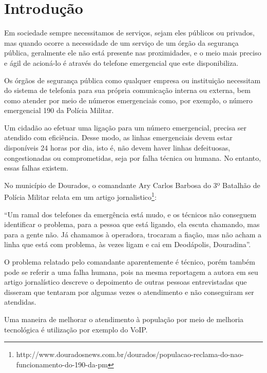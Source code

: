 
\chapter{Introdução}%
Em sociedade sempre necessitamos de serviços, sejam eles públicos ou privados, mas quando ocorre a necessidade de um serviço de um órgão da segurança pública, geralmente ele não está presente nas proximidades, e o meio mais preciso e ágil de acioná-lo é através do telefone emergencial que este disponibiliza.

Os órgãos de segurança pública como qualquer empresa ou instituição necessitam do sistema de telefonia para sua própria comunicação interna ou externa, bem como atender por meio de números emergenciais como, por exemplo, o número emergencial 190 da Polícia Militar.

Um cidadão ao efetuar uma ligação para um número emergencial, precisa ser atendido com eficiência. Desse modo, as linhas emergenciais devem estar disponíveis 24 horas por dia, isto é, não devem haver linhas defeituosas, congestionadas ou comprometidas, seja por falha técnica ou humana. No entanto, essas falhas existem.

No município de Dourados, o comandante Ary Carlos Barbosa do 3º Batalhão de Polícia Militar relata em um artigo jornalistico\footnote{http://www.douradosnews.com.br/dourados/populacao-reclama-do-nao-funcionamento-do-190-da-pm}:

\begin{citacao}
``Um ramal dos telefones da emergência está mudo, e os técnicos não conseguem identificar o problema, para a pessoa que está ligando, ela escuta chamando, mas para a gente não. Já chamamos à operadora, trocaram a fiação, mas não acham a linha que está com problema, às vezes ligam e cai em Deodápolis, Douradina''.
\end{citacao}

O problema relatado pelo comandante aparentemente é técnico, porém também pode se referir a uma falha humana, pois na mesma reportagem a autora  em seu artigo jornalístico descreve o depoimento de outras pessoas entrevistadas que disseram que tentaram por algumas vezes o atendimento e não conseguiram ser atendidas.

Uma maneira de melhorar o atendimento à população por meio de melhoria tecnológica é utilização por exemplo do VoIP. 

